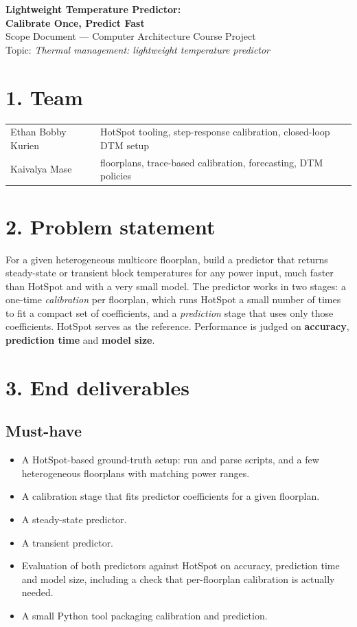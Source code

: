 \documentclass[11pt,a4paper]{article}
\begin{document}
\begin{center}
{\LARGE\bfseries Lightweight Temperature Predictor:\\[2pt] Calibrate Once, Predict Fast}\\[6pt]
{\large Scope Document --- Computer Architecture Course Project}\\[2pt]
Topic: \emph{Thermal management: lightweight temperature predictor}
\end{center}

\section*{1. Team}
\begin{tabular}{@{}ll@{}}
Ethan Bobby Kurien & HotSpot tooling, step-response calibration, closed-loop DTM setup\\
Kaivalya Mase & floorplans, trace-based calibration, forecasting, DTM policies\\
\end{tabular}

\section*{2. Problem statement}
For a given heterogeneous multicore floorplan, build a predictor that returns steady-state or
transient block temperatures for any power input, much faster than HotSpot and with a very small
model. The predictor works in two stages: a one-time \emph{calibration} per floorplan, which runs
HotSpot a small number of times to fit a compact set of coefficients, and a \emph{prediction}
stage that uses only those coefficients. HotSpot serves as the reference. Performance is judged on
\textbf{accuracy}, \textbf{prediction time} and \textbf{model size}.

\section*{3. End deliverables}
\subsection*{Must-have}
\begin{itemize}
  \item A HotSpot-based ground-truth setup: run and parse scripts, and a few heterogeneous
        floorplans with matching power ranges.
  \item A calibration stage that fits predictor coefficients for a given floorplan.
  \item A steady-state predictor.
  \item A transient predictor.
  \item Evaluation of both predictors against HotSpot on accuracy, prediction time and model size,
        including a check that per-floorplan calibration is actually needed.
  \item A small Python tool packaging calibration and prediction.
\end{itemize}
\end{document}
